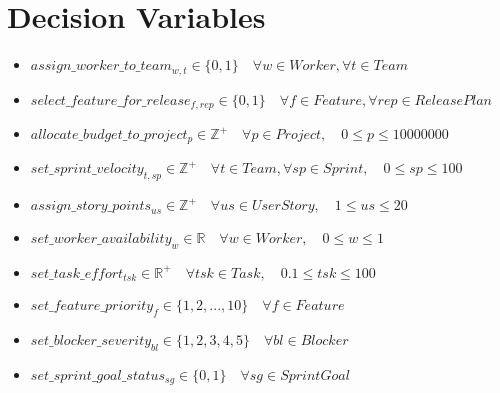 \documentclass[11pt]{article}
\begin{document}
\section{Decision Variables}
\begin{itemize}
    \item $assign\_worker\_to\_team_{w,t} \in \{0, 1\} \quad \forall w \in Worker, \forall t \in Team$
    \item $select\_feature\_for\_release_{f,rep} \in \{0, 1\} \quad \forall f \in Feature, \forall rep \in ReleasePlan$
    \item $allocate\_budget\_to\_project_{p} \in \mathbb{Z}^{+} \quad \forall p \in Project, \quad 0 \leq p \leq 10000000$
    \item $set\_sprint\_velocity_{t,sp} \in \mathbb{Z}^{+} \quad \forall t \in Team, \forall sp \in Sprint, \quad 0 \leq sp \leq 100$
    \item $assign\_story\_points_{us} \in \mathbb{Z}^{+} \quad \forall us \in UserStory, \quad 1 \leq us \leq 20$
    \item $set\_worker\_availability_{w} \in \mathbb{R} \quad \forall w \in Worker, \quad 0 \leq w \leq 1$
    \item $set\_task\_effort_{tsk} \in \mathbb{R}^{+} \quad \forall tsk \in Task, \quad 0.1 \leq tsk \leq 100$
    \item $set\_feature\_priority_{f} \in \{1,2,...,10\} \quad \forall f \in Feature$
    \item $set\_blocker\_severity_{bl} \in \{1,2,3,4,5\} \quad \forall bl \in Blocker$
    \item $set\_sprint\_goal\_status_{sg} \in \{0, 1\} \quad \forall sg \in SprintGoal$
\end{itemize}
\end{document}
